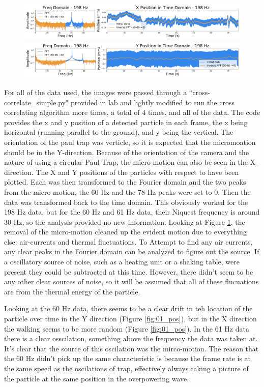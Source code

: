 \documentclass[12pt]{article}
\begin{document}
\begin{figure}[!ht]
\centering
    \includegraphics[width=\textwidth]{data_04_x_pos.pdf}
    \includegraphics[width=\textwidth]{data_04_y_pos.pdf}
	\caption{}
    \label{fig:04_pos}
\end{figure}

For all of the data used, the images were passed through a ``cross-correlate\_simple.py" provided in lab and lightly modified to run the cross correlating algorithm more times, a total of 4 times, and all of the data. The code provides the x and y position of a detected particle in each frame, the x being horizontal (running parallel to the ground), and y being the vertical. The orientation of the paul trap was verticle, so it is expected that the micromoation should be in the Y-direction. Because of the orientation of the camera and the nature of using a circular Paul Trap, the micro-motion can also be seen in the X-direction. The X and Y positions of the particles with respect to have been plotted. Each was then transformed to the Fourier domain and the two peaks from the micro-motion, the 60 Hz and the 78 Hz peaks were set to 0. Then the data was transformed back to the time domain. This obviously worked for the 198 Hz data, but for the 60 Hz and 61 Hz data, their Niquest frequency is around 30 Hz, so the analysis provided no new information. Looking at Figure \ref{fig:04_pos}, the removal of the micro-motion cleaned up the evident motion due to everything else: air-currents and thermal fluctuations. To Attempt to find any air currents, any clear peaks in the Fourier domain can be analyzed to figure out the source. If a oscillatory source of noise, such as a heating unit or a shaking table, were present they could be subtracted at this time. However, there didn't seem to be any other clear sources of noise, so it will be assumed that all of these flucuations are from the thermal energy of the particle. 

Looking at the 60 Hz data, there seems to be a clear drift in teh location of the particle over time in the Y direction (Figure \ref{fig:01_pos}), but in the X direction the walking seems to be more random (Figure \ref{fig:01_pos}). In the 61 Hz data there is a clear osscilation, something above the frequency the data was taken at. It's clear that the source of this oscilation was the mirco-motion. The reason that the 60 Hz didn't pick up the same characteristic is because the frame rate is at the same speed as the oscilations of trap, effectively always taking a picture of the particle at the same position in the overpowering wave. 
\end{document}
